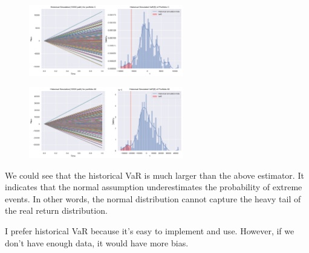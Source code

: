 \documentclass[11pt,en]{elegantpaper}
\begin{document}
\begin{figure}[htbp] 
    \centering 
    \includegraphics[width=0.6\textwidth]{./image/His_C.png} 
\end{figure}

\begin{figure}[htbp] 
    \centering 
    \includegraphics[width=0.6\textwidth]{./image/His_ALL.png} 
\end{figure}

We could see that the historical VaR is much larger than the above estimator. It indicates that the normal assumption underestimates the probability of extreme events. In other words, the normal distribution cannot capture the heavy tail of the real return distribution. 

I prefer historical VaR because it's easy to implement and use. However, if we don't have enough data, it would have more bias.
\end{document}
